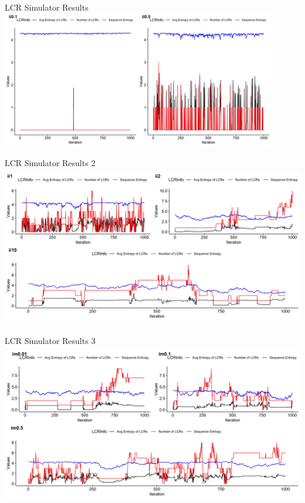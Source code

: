 \documentclass{beamer}
\begin{document}
	\begin{frame}{LCR Simulator Results}
		\includegraphics[height=6cm, width=\textwidth]{im0.01-0.1-0.5.jpeg}
	\end{frame}

	\begin{frame}{LCR Simulator Results 2}
		\includegraphics[height=7cm, width=\textwidth]{im1-2-10.jpeg}
	\end{frame}

	\begin{frame}{LCR Simulator Results 3}
		\includegraphics[height=7cm, width=\textwidth]{m0.01-0.1-0.5.jpeg}
	\end{frame}
\end{document}
